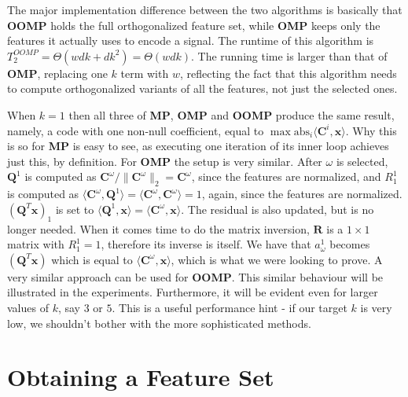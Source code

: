 \documentclass[12pt,a4paper,oneside,english]{UPBThesis}
\newcommand{\hctimes}[2]{{#1}\!\times\!{#2}}
\begin{document}
The major implementation difference between the two algorithms is basically that \textbf{OOMP} holds the full orthogonalized feature set, while \textbf{OMP} keeps only the features it actually uses to encode a signal. The runtime of this algorithm is $T_2^{OOMP} = \Theta(wdk + dk^2) = \Theta(wdk)$. The running time is larger than that of \textbf{OMP}, replacing one $k$ term with $w$, reflecting the fact that this algorithm needs to compute orthogonalized variants of all the features, not just the selected ones.

When $k=1$ then all three of \textbf{MP}, \textbf{OMP} and \textbf{OOMP} produce the same result, namely, a code with one non-null coefficient, equal to $\max\mbox{abs}_i {\langle \textbf{C}^i, \textbf{x} \rangle }$. Why this is so for \textbf{MP} is easy to see, as executing one iteration of its inner loop achieves just this, by definition. For \textbf{OMP} the setup is very similar. After $\omega$ is selected, $\textbf{Q}^1$ is computed as $\textbf{C}^\omega / \| \textbf{C}^\omega \|_2 = \textbf{C}^\omega$, since the features are normalized, and $R_1^1$ is computed as $\langle \textbf{C}^\omega, \textbf{Q}^1 \rangle = \langle \textbf{C}^\omega, \textbf{C}^\omega \rangle = 1$, again, since the features are normalized. $(\textbf{Q}^T\textbf{x})_1$ is set to $\langle \textbf{Q}^1, \textbf{x} \rangle = \langle \textbf{C}^\omega, \textbf{x} \rangle$. The residual is also updated, but is no longer needed. When it comes time to do the matrix inversion, $\textbf{R}$ is a $\hctimes{1}{1}$ matrix with $R_1^1 = 1$, therefore its inverse is itself. We have that $a_\omega^1$ becomes $(\textbf{Q}^T\textbf{x})$ which is equal to $\langle \textbf{C}^\omega, \textbf{x} \rangle$, which is what we were looking to prove. A very similar approach can be used for \textbf{OOMP}. This similar behaviour will be illustrated in the experiments. Furthermore, it will be evident even for larger values of $k$, say $3$ or $5$. This is a useful performance hint - if our target $k$ is very low, we shouldn't bother with the more sophisticated methods.

\chapter{Obtaining a Feature Set}
\label{chap:ObtainingFeatureSet}
\end{document}
